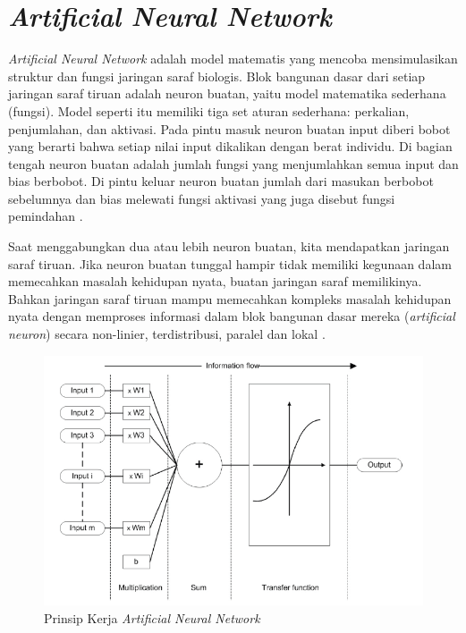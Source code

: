 \section{\emph{Artificial Neural Network}}
\emph{Artificial Neural Network} adalah model matematis yang mencoba mensimulasikan struktur dan fungsi jaringan saraf biologis. Blok bangunan dasar dari setiap
jaringan saraf tiruan adalah neuron buatan, yaitu model matematika sederhana (fungsi). Model seperti itu memiliki tiga set aturan sederhana: perkalian, penjumlahan, dan aktivasi.
Pada pintu masuk neuron buatan input diberi bobot yang berarti bahwa setiap nilai input dikalikan dengan berat individu. Di bagian tengah neuron buatan adalah jumlah
fungsi yang menjumlahkan semua input dan bias berbobot. Di pintu keluar neuron buatan jumlah dari masukan berbobot sebelumnya dan bias melewati fungsi aktivasi yang juga disebut
fungsi pemindahan \citep{ANN}.

Saat menggabungkan dua atau lebih neuron buatan, kita mendapatkan jaringan saraf tiruan. Jika neuron buatan tunggal hampir tidak memiliki kegunaan dalam memecahkan masalah kehidupan nyata, buatan
jaringan saraf memilikinya. Bahkan jaringan saraf tiruan mampu memecahkan kompleks masalah kehidupan nyata dengan memproses informasi dalam blok bangunan dasar mereka (\emph{artificial neuron})
secara non-linier, terdistribusi, paralel dan lokal \citep{ANN}.

\begin{figure} [ht] \centering
  \includegraphics{gambar/ann.png}
  \vspace*{2mm}
  \caption{Prinsip Kerja \emph{Artificial Neural Network} \citep{ANN}}
\end{figure}


